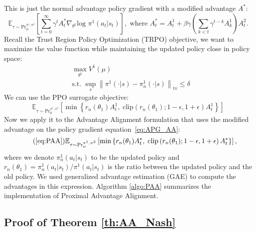 \documentclass{article} \usepackage{iclr2025_conference,times}
\def\eqref#1{equation~\ref{#1}}
\begin{document}
This is just the normal advantage policy gradient with a modified advantage $A^*$:
\begin{equation}
    \label{eq:APG_AA}
    \mathbb{E}_{\tau \sim \text{Pr}_{\mu}^{\pi^1, \pi^2}} \left[\sum_{t=0}^\infty \gamma^t A^*_t \nabla_{\theta^1}\text{log } \pi^1(a_t|s_t) \right], \text{ where } A^*_t = A^1_t + \beta \gamma \left(\sum_{k<t} \gamma^{t-k} A^{1}_k \right)A^2_t.
\end{equation}
Recall the Trust Region Policy Optimization (TRPO) \citep{schulman2017trust} objective, we want to maximize the value function while maintaining the updated policy close in policy space: 
\begin{equation}
    \label{eq:TRPO}
    \begin{aligned}
        &\max_{\theta^1} V^{1}(\mu)\\
        &\text{s.t. } \sup_{s}\left\|\pi^1(\cdot|s) - \pi_n^1(\cdot|s)\right\|_{\text{tv}}\leq \delta
    \end{aligned}
\end{equation}
We can use the PPO \citep{schulman2017proximal} surrogate objective:
\begin{equation}
    \label{eq:PPO}
    \mathbb{E}_{\tau \sim \text{Pr}_{\mu}^{\pi^1, \pi^2}} \left[\min \left\{r_n(\theta_1)A^1_t, \;\text{clip}\left(r_n(\theta_1);1-\epsilon, 1+\epsilon \right)A^1_t \right \}\right]
\end{equation}
Now we apply it to the Advantage Alignment formulation that uses the modified advantage on the policy gradient \eqref{eq:APG_AA}:
\begin{equation}
    \tag{\ref{eq:PAA}}
    \mathbb{E}_{\tau \sim \text{Pr}_{\mu}^{\pi^1, \pi^2}} \left[\min \left\{r_n(\theta_1)A^*_t, \;\text{clip}\left(r_n(\theta_1);1-\epsilon, 1+\epsilon \right)A^*_t \right \}\right],
\end{equation}
where we denote $\pi^1_n(a_t|s_t)$ to be the updated policy and $r_n(\theta_1) = \pi^1_n(a_t|s_t)/\pi^1(a_t|s_t)$ is the ratio between the updated policy and the old policy. We used generalized advantage estimation (GAE) \citep{schulman2018highdimensional}
to compute the advantages in this expression. Algorithm \ref{algo:PAA} summarizes the implementation of Proximal Advantage Alignment.

\subsection{Proof of Theorem \ref{th:AA_Nash}}
\label{app:AA_preserves_NE}
\end{document}
